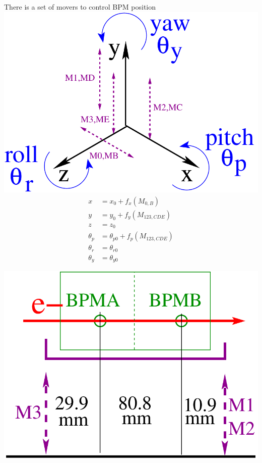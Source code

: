 \documentclass[a4paper,11pt]{book}
\begin{document}
{\tiny There is a set of movers to control BPM position}\vspace{-0.5cm}
\centering
\includegraphics[scale=0.30,angle=0]{fig25.pdf} 
\begin{align*}
 x &= x_0+f_x(M_{0,B})\\
 y &= y_0+f_y(M_{123,CDE})\\
 z &= z_0\\
 \theta_p &= \theta_{p0}+f_p(M_{123,CDE})\\
 \theta_r &= \theta_{r0}\\
 \theta_y &= \theta_{y0}
\end{align*}\par
\vspace*{-0.4cm}{\tiny All initial values are set during the IP BPMs installation}
\includegraphics[scale=0.25,angle=0]{fig27.pdf}
\end{document}
